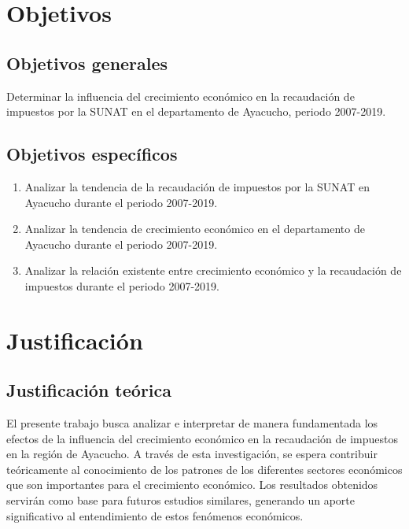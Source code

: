 \documentclass[
  letterpaper,
  DIV=11,
  numbers=noendperiod]{scrartcl}
\begin{document}
\hypertarget{sec-objetivos}{%
\section{Objetivos}\label{sec-objetivos}}

\hypertarget{sec-objetivos-generales}{%
\subsection{Objetivos generales}\label{sec-objetivos-generales}}

Determinar la influencia del crecimiento económico en la recaudación de
impuestos por la SUNAT en el departamento de Ayacucho, periodo
2007-2019.

\hypertarget{sec-objetivos-especuxedficos}{%
\subsection{Objetivos específicos}\label{sec-objetivos-especuxedficos}}

\begin{enumerate}
\def\labelenumi{\arabic{enumi}.}
\item
  Analizar la tendencia de la recaudación de impuestos por la SUNAT en
  Ayacucho durante el periodo 2007-2019.
\item
  Analizar la tendencia de crecimiento económico en el departamento de
  Ayacucho durante el periodo 2007-2019.
\item
  Analizar la relación existente entre crecimiento económico y la
  recaudación de impuestos durante el periodo 2007-2019.
\end{enumerate}

\hypertarget{sec-justificaciuxf3n}{%
\section{Justificación}\label{sec-justificaciuxf3n}}

\hypertarget{sec-justificaciuxf3n-teuxf3rica}{%
\subsection{Justificación
teórica}\label{sec-justificaciuxf3n-teuxf3rica}}

El presente trabajo busca analizar e interpretar de manera fundamentada
los efectos de la influencia del crecimiento económico en la recaudación
de impuestos en la región de Ayacucho. A través de esta investigación,
se espera contribuir teóricamente al conocimiento de los patrones de los
diferentes sectores económicos que son importantes para el crecimiento
económico. Los resultados obtenidos servirán como base para futuros
estudios similares, generando un aporte significativo al entendimiento
de estos fenómenos económicos.
\end{document}
